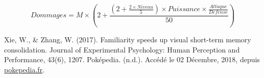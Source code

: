 \documentclass[a4paper,11pt]{article}
\begin{document}
        \begin{equation}
          \label{equation:dmg}
          Dommages = M \times (2 + \frac{(2+\frac{2 \times Niveau}{5}) \times Puissance \times \frac{Attaque}{Defense} }{50})
        \end{equation}

    \begin{thebibliography}{9}
        Xie, W., \& Zhang, W. (2017). Familiarity speeds up visual short-term memory consolidation. Journal of Experimental Psychology: Human Perception and Performance, 43(6), 1207.
        Poképedia. (n.d.). Accédé le 02 Décembre, 2018, depuis \url{pokepedia.fr}.
    \end{thebibliography}

  
\end{document}
